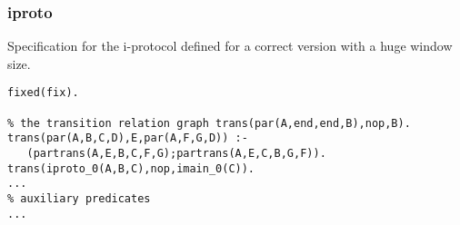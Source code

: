 \subsubsection*{iproto}

Specification for the i-protocol defined for a correct version with a huge window size.

\begin{Verbatim}
fixed(fix).

% the transition relation graph trans(par(A,end,end,B),nop,B).
trans(par(A,B,C,D),E,par(A,F,G,D)) :-
   (partrans(A,E,B,C,F,G);partrans(A,E,C,B,G,F)). 
trans(iproto_0(A,B,C),nop,imain_0(C)).
...
% auxiliary predicates
...
\end{Verbatim}